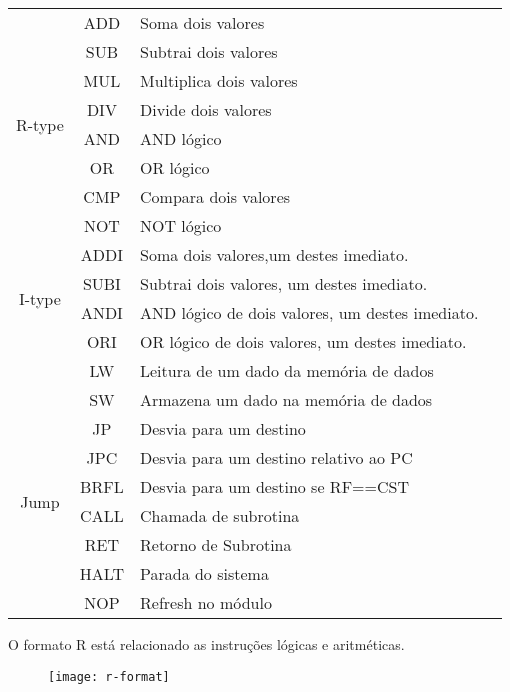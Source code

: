 \begin{center}
\begin{longtable}[pos]{| c | c | l | m{7cm} |}
			\multirow{8}{*}{R-type} & ADD & Soma dois valores \\ \cline{2-3}	
	& SUB & Subtrai dois valores \\ \cline{2-3}	
	& MUL & Multiplica dois valores \\ \cline{2-3}	
	& DIV & Divide dois valores \\ \cline{2-3}
	& AND & AND lógico \\ \cline{2-3}
	& OR & OR lógico  \\ \cline{2-3}
	& CMP & Compara dois valores \\ \cline{2-3}
	& NOT & NOT lógico \\ \hline 
	\multirow{4}{*}{I-type} & ADDI & Soma dois valores,um destes imediato. \\ \cline{2-3}
	& SUBI & Subtrai dois valores, um destes imediato. \\ \cline{2-3}
	& ANDI & AND lógico de dois valores, um destes imediato. \\ \cline{2-3}
	& ORI & OR lógico de dois valores, um destes imediato. \\ \cline{2-3}
	& LW & Leitura de um dado da memória de dados \\ \cline{2-3}
	& SW & Armazena um dado na memória de dados \\ \hline
	\multirow{6}{*}{Jump} & JP & Desvia para um destino \\ \cline{2-3}
	& JPC & Desvia para um destino relativo ao PC \\ \cline{2-3}
	& BRFL & Desvia para um destino se RF==CST \\ \cline{2-3}
	& CALL & Chamada de subrotina \\ \cline{2-3}
	& RET & Retorno de Subrotina \\ \cline{2-3}
	& HALT & Parada do sistema \\ \cline{2-3}
	& NOP & Refresh no módulo \\ \hline
\end{longtable}
\end{center}

	O formato R está relacionado as instruções lógicas e aritméticas.
	\begin{figure}[H]
    	\centering
    	\texttt{[image: r-format]}
	\end{figure}
	
